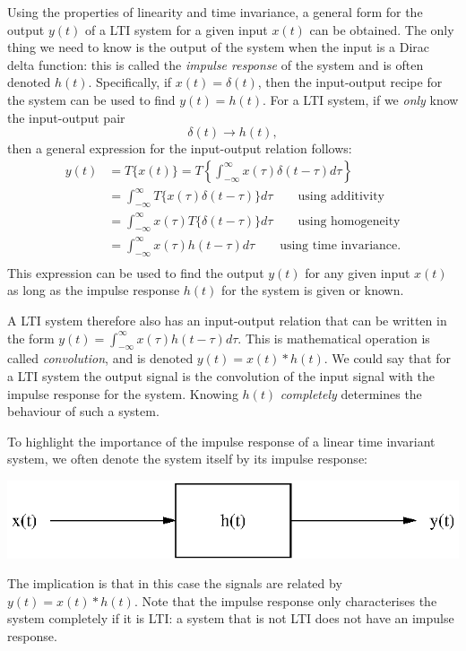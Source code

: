 \documentclass[10pt]{beamer}
\newcommand{\conv}{\ast}
\begin{document}
Using the properties of linearity and time invariance, a general form for the output $y(t)$ of a LTI system for a given input $x(t)$ can be obtained.  The only thing we need to know is the output of the system when the input is a Dirac delta function:  this is called the {\em impulse response} of the system and is often denoted $h(t)$.  Specifically, if $x(t) = \delta(t)$, then the input-output recipe for the system can be used to find $y(t) = h(t)$.  For a LTI system, if we {\em only} know the input-output pair 
\begin{equation*}
  \delta(t) \longrightarrow h(t),
\end{equation*}
then a general expression for the input-output relation follows:
\begin{align*}
  y(t) &= T\{x(t)\} = T \left\{ \int_{-\infty}^\infty x(\tau) \delta(t - \tau) d\tau \right\} \\
  &= \int_{-\infty}^\infty T \{ x(\tau) \delta(t - \tau) \} d\tau \qquad \text{using additivity} \\
  &= \int_{-\infty}^\infty x(\tau) T \{ \delta(t - \tau) \} d\tau \qquad \text{using homogeneity} \\
  &= \int_{-\infty}^\infty x(\tau) h(t - \tau) d\tau \qquad \text{using time invariance.} \\
\end{align*}
This expression can be used to find the output $y(t)$ for any given input $x(t)$ as long as the impulse response $h(t)$ for the system is given or known.

A LTI system therefore also has an input-output relation that can be written in the form $y(t) = \int_{-\infty}^\infty x(\tau) h(t - \tau) d\tau$.  This is mathematical operation is called {\em convolution}, and is denoted $y(t) = x(t) \conv h(t)$.  We could say that for a LTI system the output signal is the convolution of the input signal with the impulse response for the system.  Knowing $h(t)$ {\em completely} determines the behaviour of such a system.

To highlight the importance of the impulse response of a linear time invariant system, we often denote the system itself by its impulse response:
\begin{center}
  \includegraphics{simpleltisystem}
\end{center}
The implication is that in this case the signals are related by $y(t) = x(t) \conv h(t)$.  Note that the impulse response only characterises the system completely if it is LTI:  a system that is not LTI does not have an impulse response.
\end{document}
